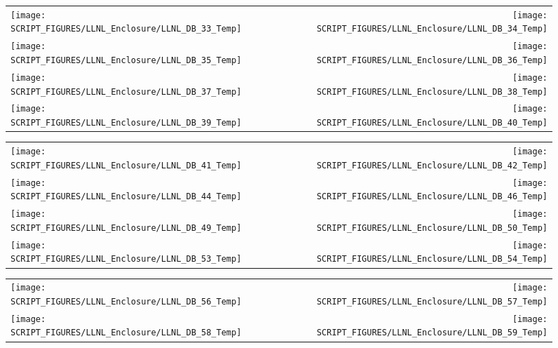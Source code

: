 \begin{figure}[p]
\begin{tabular*}{\textwidth}{l@{\extracolsep{\fill}}r}
\texttt{[image: SCRIPT\_FIGURES/LLNL\_Enclosure/LLNL\_DB\_33\_Temp]} &
\texttt{[image: SCRIPT\_FIGURES/LLNL\_Enclosure/LLNL\_DB\_34\_Temp]} \\
\texttt{[image: SCRIPT\_FIGURES/LLNL\_Enclosure/LLNL\_DB\_35\_Temp]} &
\texttt{[image: SCRIPT\_FIGURES/LLNL\_Enclosure/LLNL\_DB\_36\_Temp]} \\
\texttt{[image: SCRIPT\_FIGURES/LLNL\_Enclosure/LLNL\_DB\_37\_Temp]} &
\texttt{[image: SCRIPT\_FIGURES/LLNL\_Enclosure/LLNL\_DB\_38\_Temp]} \\
\texttt{[image: SCRIPT\_FIGURES/LLNL\_Enclosure/LLNL\_DB\_39\_Temp]} &
\texttt{[image: SCRIPT\_FIGURES/LLNL\_Enclosure/LLNL\_DB\_40\_Temp]}
\end{tabular*}
\end{figure}

\begin{figure}[p]
\begin{tabular*}{\textwidth}{l@{\extracolsep{\fill}}r}
\texttt{[image: SCRIPT\_FIGURES/LLNL\_Enclosure/LLNL\_DB\_41\_Temp]} &
\texttt{[image: SCRIPT\_FIGURES/LLNL\_Enclosure/LLNL\_DB\_42\_Temp]} \\
\texttt{[image: SCRIPT\_FIGURES/LLNL\_Enclosure/LLNL\_DB\_44\_Temp]} &
\texttt{[image: SCRIPT\_FIGURES/LLNL\_Enclosure/LLNL\_DB\_46\_Temp]} \\
\texttt{[image: SCRIPT\_FIGURES/LLNL\_Enclosure/LLNL\_DB\_49\_Temp]} &
\texttt{[image: SCRIPT\_FIGURES/LLNL\_Enclosure/LLNL\_DB\_50\_Temp]} \\
\texttt{[image: SCRIPT\_FIGURES/LLNL\_Enclosure/LLNL\_DB\_53\_Temp]} &
\texttt{[image: SCRIPT\_FIGURES/LLNL\_Enclosure/LLNL\_DB\_54\_Temp]}
\end{tabular*}
\end{figure}

\begin{figure}[p]
\begin{tabular*}{\textwidth}{l@{\extracolsep{\fill}}r}
\texttt{[image: SCRIPT\_FIGURES/LLNL\_Enclosure/LLNL\_DB\_56\_Temp]} &
\texttt{[image: SCRIPT\_FIGURES/LLNL\_Enclosure/LLNL\_DB\_57\_Temp]} \\
\texttt{[image: SCRIPT\_FIGURES/LLNL\_Enclosure/LLNL\_DB\_58\_Temp]} &
\texttt{[image: SCRIPT\_FIGURES/LLNL\_Enclosure/LLNL\_DB\_59\_Temp]}
\end{tabular*}
\end{figure}

